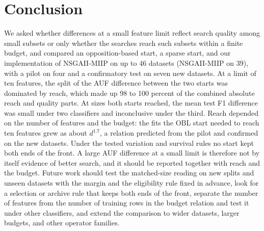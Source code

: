 
\section{Conclusion}
\label{sec:conclusion}

We asked whether differences at a small feature limit reflect search quality among small subsets or only whether the searches reach such subsets within a finite budget, and compared an opposition-based start, a sparse start, and our implementation of NSGAII-MIIP on up to 46 datasets (NSGAII-MIIP on 39), with a pilot on four and a confirmatory test on seven new datasets. At a limit of ten features, the split of the AUF difference between the two starts was dominated by reach, which made up 98 to 100 percent of the combined absolute reach and quality parts. At sizes both starts reached, the mean test F1 difference was small under two classifiers and inconclusive under the third. Reach depended on the number of features and the budget: the fits the OBL start needed to reach ten features grew as about $d^{1.7}$, a relation predicted from the pilot and confirmed on the new datasets. Under the tested variation and survival rules no start kept both ends of the front. A large AUF difference at a small limit is therefore not by itself evidence of better search, and it should be reported together with reach and the budget. Future work should test the matched-size reading on new splits and unseen datasets with the margin and the eligibility rule fixed in advance, look for a selection or archive rule that keeps both ends of the front, separate the number of features from the number of training rows in the budget relation and test it under other classifiers, and extend the comparison to wider datasets, larger budgets, and other operator families.
